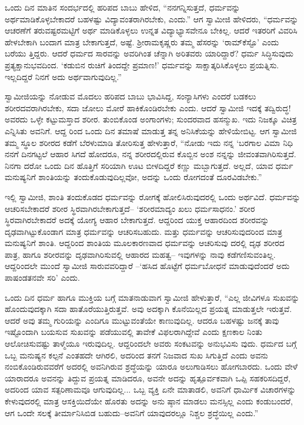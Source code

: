 ಒಂದು ದಿನ ಮಾತಿನ ಸಂದರ್ಭದಲ್ಲಿ ಹರಿಪದ ಬಾಬು ಹೇಳಿದ, “ನನಗನ್ನಿಸುತ್ತದೆ, ಧರ್ಮವನ್ನು ಅರ್ಥಮಾಡಿಕೊಳ್ಳಬೇಕಾದರೆ ಬಹಳಷ್ಟು ವಿದ್ಯಾವಂತರಾಗಿರಬೇಕು, ಎಂದು.” ಆಗ ಸ್ವಾಮೀಜಿ ಹೇಳಿದರು, “ಧರ್ಮವನ್ನು ಆಚರಣೆಗೆ ತರುವಷ್ಟರಮಟ್ಟಿಗೆ ಅರ್ಥ ಮಾಡಿಕೊಳ್ಳಲು ಉನ್ನತ ವಿದ್ಯಾಭ್ಯಾಸವೇನೂ ಬೇಕಿಲ್ಲ. ಆದರೆ ಇತರರಿಗೆ ವಿವರಿಸಿ ಹೇಳಬೇಕಾಗಿ ಬಂದಾಗ ಮಾತ್ರ ಬೇಕಾಗುತ್ತದೆ, ಅಷ್ಟೆ. ಶ್ರೀರಾಮಕೃಷ್ಣರು ತಮ್ಮ ಹೆಸರನ್ನು ‘ರಾಮ್​ಕೆಸ್ಟೊ’ ಎಂದು ಬರೆಯು ತ್ತಿದ್ದರು. ಆದರೆ ಧರ್ಮದ ಸಾರವನ್ನು ಅವರಿಗಿಂತ ಚೆನ್ನಾಗಿ ಅರಿತವರು ಯಾರಿದ್ದಾರೆ? ಧರ್ಮ ಸಿದ್ಧಿಸುವುದು ಪ್ರತ್ಯಕ್ಷಾನುಭವದಿಂದ. ‘ಕಡುಬಿನ ರುಚಿಗೆ ತಿಂದದ್ದೇ ಪ್ರಮಾಣ!’ ಧರ್ಮವನ್ನು ಸಾಕ್ಷಾತ್ಕರಿಸಿಕೊಳ್ಳಲು ಪ್ರಯತ್ನಿಸು. ಇಲ್ಲದಿದ್ದರೆ ನಿನಗೆ ಅದು ಅರ್ಥವಾಗುವುದಿಲ್ಲ.”

ಸ್ವಾಮೀಜಿಯನ್ನು ನೋಡುವ ಮೊದಲು ಹರಿಪದ ಬಾಬು ಭಾವಿಸಿದ್ದ, ಸಂನ್ಯಾಸಿಗಳು ಎಂದರೆ ಬಡಕಲು ಶರೀರದವರಾಗಿರಬೇಕು, ಸದಾ ಜೋಲು ಮೋರೆ ಹಾಕಿಕೊಂಡಿರಬೇಕು ಎಂದು. ಆದರೆ ಸ್ವಾಮೀಜಿ ಇದಕ್ಕೆ ತದ್ವಿರುದ್ಧ! ಅವರದು ಒಳ್ಳೇ ಕಟ್ಟುಮಸ್ತಾದ ಶರೀರ. ತುಂಬಿಕೊಂಡ ಅಂಗಾಂಗಳು; ಸುಂದರವಾದ ಹಸನ್ಮುಖ. ಇದು ನಿಜಕ್ಕೂ ವಿಚಿತ್ರ ಎನ್ನಿಸಿತು ಅವನಿಗೆ. ಆದ್ದ ರಿಂದ ಒಂದು ದಿನ ತಮಾಷೆ ಮಾಡುತ್ತ ತನ್ನ ಅನಿಸಿಕೆಯನ್ನು ಹೇಳಿಯೇಬಿಟ್ಟ. ಆಗ ಸ್ವಾಮೀಜಿ ತಮ್ಮ ಸ್ಥೂಲ ಶರೀರದ ಕಡೆಗೆ ಬೆರಳುಮಾಡಿ ತೋರಿಸುತ್ತ ಹೇಳುತ್ತಾರೆ, “ನೋಡು ಇದು ನನ್ನ ‘ಬರಗಾಲ ವಿಮಾ ನಿಧಿ ನನಗೆ ದಿನಗಟ್ಟಲೆ ಆಹಾರ ಸಿಗದೆ ಹೋದರೂ, ನನ್ನ ಶರೀರದಲ್ಲಿರುವ ಕೊಬ್ಬಿನ ಅಂಶ ನನ್ನನ್ನು ಜೀವಂತವಾಗಿರಿಸುತ್ತದೆ. ನಿನಗಾ ದರೋ ಒಂದು ದಿನ ಹೊತ್ತಿಗೆ ಸರಿಯಾಗಿ ಊಟ ಬೀಳದಿದ್ದರೆ ಕಣ್ಣು ಮಬ್ಬಾಗುತ್ತದೆ. ಅಲ್ಲದೆ, ಯಾವ ಧರ್ಮ ಮನುಷ್ಯನಿಗೆ ಶಾಂತಿಯನ್ನು ತಂದುಕೊಡುವುದಿಲ್ಲವೋ, ಅದನ್ನು ಒಂದು ರೋಗದಂತೆ ದೂರವಿಡಬೇಕು.”

ಇಲ್ಲಿ ಸ್ವಾಮೀಜಿ, ಶಾಂತಿ ತಂದುಕೊಡದ ಧರ್ಮವನ್ನು ರೋಗಕ್ಕೆ ಹೋಲಿಸಿರುವುದರಲ್ಲಿ ಒಂದು ಅರ್ಥವಿದೆ. ಧರ್ಮವನ್ನು ಆಚರಿಸಬೇಕಾದರೆ ಶರೀರ ಸ್ಥಿರವಾಗಿರಬೇಕಾಗುತ್ತದೆ– ‘ಶರೀರಮಾದ್ಯಂ ಖಲು ಧರ್ಮಸಾಧನಂ.’ ಶರೀರ ಸ್ಥಿರವಾಗಿರಬೇಕಾದರೆ ಅದಕ್ಕೆ ಯೋಗ್ಯ ಆಹಾರ ಬೇಕಾಗುತ್ತದೆ. ಆದ್ದರಿಂದ ಯುಕ್ತ ಆಹಾರದಿಂದ ಶರೀರವನ್ನು ದೃಢವಾಗಿಟ್ಟುಕೊಂಡಾಗ ಮಾತ್ರ ಧರ್ಮವನ್ನು ಆಚರಿಸಬಹುದು. ಮತ್ತು ಧರ್ಮವನ್ನು ಆಚರಿಸುವುದರಿಂದ ಮಾತ್ರ ಮನುಷ್ಯನಿಗೆ ಶಾಂತಿ. ಆದ್ದರಿಂದ ಶಾಂತಿಯ ಮೂಲಕಾರಣವಾದ ಧರ್ಮವನ್ನು ಆಚರಿಸುವು ದರಲ್ಲಿ ದೃಢ ಶರೀರದ ಪಾತ್ರ, ಹಾಗೂ ಶರೀರವನ್ನು ದೃಢವಾಗಿರಿಸುವಲ್ಲಿ ಆಹಾರದ ಮಹತ್ವ– ಇವುಗಳನ್ನು ನಾವು ಕಡೆಗಣಿಸುವಂತಿಲ್ಲ. ಆದ್ದರಿಂದಲೇ ಮುಂದೆ ಸ್ವಾಮೀಜಿ ಸಾರುವವರಿದ್ದಾರೆ –‘ಹಸಿದ ಹೊಟ್ಟೆಗೆ ಧರ್ಮಬೋಧನೆ ಮಾಡುವುದೆಂದರೆ ಅದು ಪಾಷಂಡತನವೇ ಸರಿ’ ಎಂದು.

ಒಂದು ದಿನ ಧರ್ಮ ಹಾಗೂ ಮುಕ್ತಿಯ ಬಗ್ಗೆ ಮಾತನಾಡುವಾಗ ಸ್ವಾಮೀಜಿ ಹೇಳುತ್ತಾರೆ, “ಎಲ್ಲ ಜೀವಿಗಳೂ ಸುಖವನ್ನು ಹೊಂದುವುದಕ್ಕಾಗಿ ಸದಾ ಹಾತೊರೆಯುತ್ತಿರುತ್ತವೆ. ಅವು ಅದಕ್ಕಾಗಿ ಕೊನೆಯಿಲ್ಲದ ಪ್ರಯತ್ನ ಮಾಡುತ್ತಲೇ ಇರುತ್ತವೆ. ಆದರೆ ಅವು ತಮ್ಮ ಗುರಿಯನ್ನು ಎಂದಿಗೂ ಮುಟ್ಟುವಂತೆಯೇ ಕಾಣುವುದಿಲ್ಲ. ಆದರೂ ಬಹಳಷ್ಟು ಜನಕ್ಕೆ ತಾವು ಇಷ್ಟೊಂದಾಗಿ ಬಯಸುವ ಸುಖವನ್ನು ಪಡೆಯುವಲ್ಲಿ ತಾವೇಕೆ ವಿಫಲರಾಗಿದ್ದೇವೆ ಎಂದು ಕ್ಷಣಕಾಲ ನಿಂತು ಆಲೋಚಿಸುವಷ್ಟು ತಾಳ್ಮೆಯೂ ಇರುವುದಿಲ್ಲ. ಆದ್ದರಿಂದಲೇ ಅವರು ಸಂಕಟವನ್ನು ಅನುಭವಿಸು ವುದು. ಧರ್ಮದ ಬಗ್ಗೆ ಒಬ್ಬ ಮನುಷ್ಯನ ಕಲ್ಪನೆ ಎಂತಹದೇ ಆಗಿರಲಿ, ಅದರಿಂದ ತನಗೆ ನಿಜವಾದ ಸುಖ ಸಿಗುತ್ತಿದೆ ಎಂದು ಅವನು ನಂಬಿಕೊಂಡಿರುವವರೆಗೆ ಅದರಲ್ಲಿ ಅವನಿಗಿರುವ ಶ್ರದ್ಧೆಯನ್ನು ಯಾರೂ ಅಲುಗಾಡಿಸಲು ಹೋಗಬಾರದು. ಒಂದು ವೇಳೆ ಯಾರಾದರೂ ಅವನನ್ನು ತಿದ್ದುವ ಪ್ರಯತ್ನ ಮಾಡಿದರೂ, ಅವನೇ ಅದನ್ನು ಹೃತ್ಪೂರ್ವಕವಾಗಿ ಒಪ್ಪಿ ಸಹಕರಿಸದಿದ್ದರೆ, ಅದರಿಂದ ಯಾವ ಸತ್ಪರಿಣಾಮವೂ ಆಗುವುದಿಲ್ಲ... ಒಬ್ಬ ವ್ಯಕ್ತಿ ಏನೇ ಮಾತಾಡಲಿ, ಅವನಿಗೆ ಧಾರ್ಮಿಕ ವಿಚಾರಗಳನ್ನು ಕೇಳುವುದರಲ್ಲಿ ಮಾತ್ರ ಆಸಕ್ತಿಯಿದೆಯೇ ಹೊರತು ಅದನ್ನು ಅನು ಷ್ಠಾನ ಮಾಡಲು ಮನಸ್ಸಿಲ್ಲ ಎಂದು ಕಂಡುಬಂದರೆ, ಆಗ ಒಂದೇ ಸಲಕ್ಕೆ ತೀರ್ಮಾನಿಸಿಬಿಡ ಬಹುದು–ಅವನಿಗೆ ಯಾವುದರಲ್ಲೂ ನಿಶ್ಚಲ ಶ್ರದ್ಧೆಯಿಲ್ಲ ಎಂದು.”

